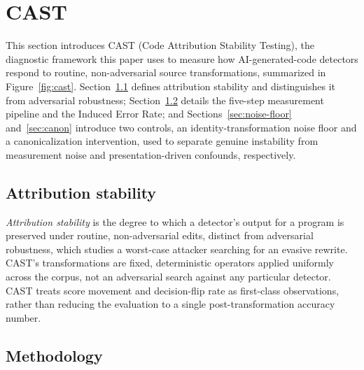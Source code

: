 \documentclass[sigconf,review,anonymous]{acmart}
\begin{document}
\section{CAST}

This section introduces CAST (Code Attribution Stability Testing), the diagnostic framework this paper uses to measure how AI-generated-code detectors respond to routine, non-adversarial source transformations, summarized in Figure~\ref{fig:cast}. Section~\ref{sec:attribution-stability} defines attribution stability and distinguishes it from adversarial robustness; Section~\ref{sec:methodology} details the five-step measurement pipeline and the Induced Error Rate; and Sections~\ref{sec:noise-floor} and~\ref{sec:canon} introduce two controls, an identity-transformation noise floor and a canonicalization intervention, used to separate genuine instability from measurement noise and presentation-driven confounds, respectively.

\subsection{Attribution stability}
\label{sec:attribution-stability}

\emph{Attribution stability} is the degree to which a detector's output for a program is preserved under routine, non-adversarial edits, distinct from adversarial robustness, which studies a worst-case attacker searching for an evasive rewrite. CAST's transformations are fixed, deterministic operators applied uniformly across the corpus, not an adversarial search against any particular detector. CAST treats score movement and decision-flip rate as first-class observations, rather than reducing the evaluation to a single post-transformation accuracy number.

\subsection{Methodology}
\label{sec:methodology}
\end{document}
